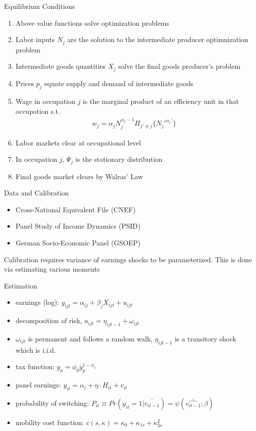 \documentclass{beamer}
\begin{document}
\begin{frame}{Equilibrium Conditions}
  \begin{enumerate}
    \item Above value functions solve optimization problems
    \item Labor inputs $N_j$ are the solution to the intermediate producer optimnization problem
    \item Intermediate goods quantities $X_j$ solve the final goods producer's problem
    \item Prices $p_j$ equate supply and demand of intermediate goods
    \item Wage in occupation $j$ is the marginal product of an efficiency unit in that occupation s.t.
    \begin{gather*}
      w_j = \alpha_j N^{\alpha_j-1}_j \Pi_{j'\ne j}\{N_j'^{\alpha_j'}\}
    \end{gather*}
    \item Labor markets clear at occupational level
    \item In occupation $j$, $\Psi_j$ is the stationary distribution
    \item Final goods market clears by Walras' Law
  \end{enumerate}
\end{frame}

\begin{frame}{Data and Calibration}
  \begin{itemize}{Data Used}
    \item Cross-National Equivalent File (CNEF)
    \item Panel Study of Income Dynamics (PSID)
    \item German Socio-Economic Panel (GSOEP)
  \end{itemize}
  \pause
  Calibration requires variance of earnings shocks to be parameterized. This is done via estimating various moments
\end{frame}

\begin{frame}{Estimation}
  \begin{itemize}
    \item earnings (log): $y_{ijt} =\alpha_{ij} + \beta_j X_{ijt} + u_{ijt}$
    \item decomposition of risk, $u_{ijt} = \eta_{ijt-1} + \omega_{ijt}$
    \item $\omega_{ijt}$ is permanent and follows a random walk, $\eta_{ijt-1}$ is a transitory shock which is i.i.d.
    \item tax function: $y_a = \phi_0 y_p^{1-\phi_1}$
    \item panel earnings: $y_{it} = \alpha_i + \eta\cdot H_{it} + v_{it}$
    \item probability of switching: $P_{it} \equiv Pr(y_{it}=1|\bar{\hat{v_{it-1}}}) = \psi(\bar{\hat{v_{it-1}}};\beta)$
    \item mobility cost function: $c(s, \kappa) = \kappa_0 + \kappa_{1s} + \kappa_{2s}^2$ 
  \end{itemize}
\end{frame}
\end{document}
